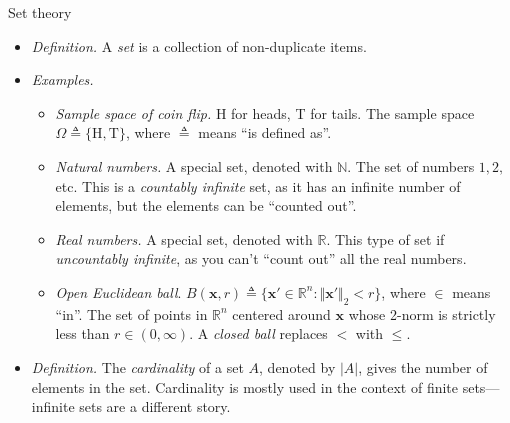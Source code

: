 \documentclass{beamer}
\begin{document}
\begin{frame}{Set theory}
    \begin{itemize}
        \item
        \textit{Definition.} A \textit{set} is a collection of non-duplicate
        items.

        \item
        \textit{Examples.}
        \begin{itemize}
            \item
            \textit{Sample space of coin flip.} H for heads, T for tails. The
            sample space $ \Omega \triangleq \{\text{H}, \text{T}\} $, where
            $ \triangleq $ means ``is defined as''.

            \item
            \textit{Natural numbers.} A special set, denoted with
            $ \mathbb{N} $. The set of numbers $ 1, 2, $ etc. This is a
            \textit{countably infinite} set, as it has an infinite number of
            elements, but the elements can be ``counted out''.

            \item
            \textit{Real numbers.} A special set, denoted with $ \mathbb{R} $.
            This type of set if \textit{uncountably infinite}, as you can't
            ``count out'' all the real numbers.

            \item
            \textit{Open Euclidean ball}. $ B(\mathbf{x}, r) \triangleq
            \{\mathbf{x}' \in \mathbb{R}^n : \Vert\mathbf{x}'\Vert_2 < r\} $,
            where $ \in $ means ``in''. The set of points in $ \mathbb{R}^n $
            centered around $ \mathbf{x} $ whose 2-norm is strictly less than
            $ r \in (0, \infty) $. A \textit{closed ball} replaces $ < $ with
            $ \le $.
        \end{itemize}

        \item
        \textit{Definition.} The \textit{cardinality} of a set $ A $, denoted
        by $ |A| $, gives the number of elements in the set. Cardinality is
        mostly used in the context of finite sets---infinite sets are a
        different story.
    \end{itemize}
\end{frame}
\end{document}
